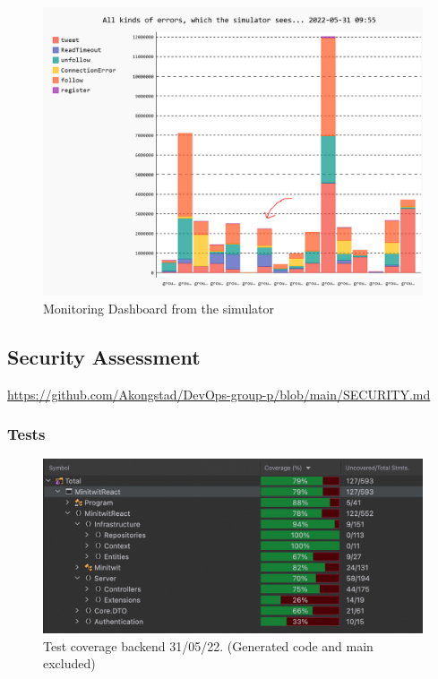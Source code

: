 \begin {figure}[H]
    \centering
    \includegraphics[scale=0.42]{images/monitoring/SimulatorMonitor.PNG}
    \caption{Monitoring Dashboard from the simulator}
    \label{fig:simMonitor}
\end{figure}



\subsection{Security Assessment}
\label{app:secAss}
\href{https://github.com/Akongstad/DevOps-group-p/blob/main/SECURITY.md}{https://github.com/Akongstad/DevOps-group-p/blob/main/SECURITY.md}

\subsubsection{Tests}
\label{app:testSuite}
\begin {figure}[H]
    \centering
    \includegraphics[scale=0.42]{images/testCoverage.png}
    \caption{Test coverage backend 31/05/22. (Generated code and main excluded)}
    \label{fig:testCov}
\end{figure}

